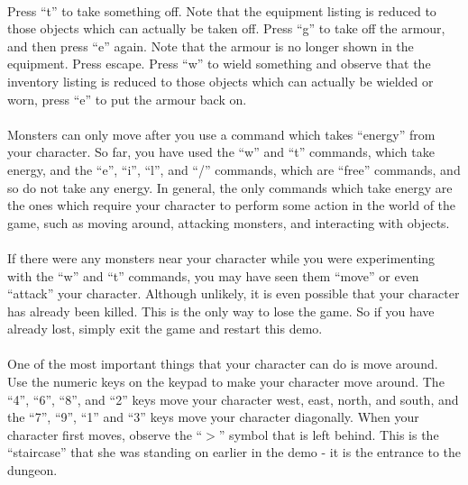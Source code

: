\paragraph{}Press ``t'' to take something off. Note that the equipment listing is
reduced to those objects which can actually be taken off. Press ``g'' to
take off the armour, and then press ``e'' again. Note that the armour is
no longer shown in the equipment. Press escape. Press ``w'' to wield
something and observe that the inventory listing is reduced to those
objects which can actually be wielded or worn, press ``e'' to put the
armour back on.

\paragraph{}Monsters can only move after you use a command which takes
``energy'' from
your character. So far, you have used the ``w'' and ``t'' commands, which
take energy, and the ``e'', ``i'', ``l'', and ``/'' commands, which are
``free''
commands, and so do not take any energy. In general, the only commands
which take energy are the ones which require your character to perform
some action in the world of the game, such as moving around, attacking
monsters, and interacting with objects.

\paragraph{}If there were any monsters near your character while you were
experimenting with the ``w'' and ``t'' commands, you may have seen them
``move'' or even ``attack'' your character. Although unlikely, it is even
possible that your character has already been killed. This is the only
way to lose the game. So if you have already lost, simply exit the game
and restart this demo.

\paragraph{}One of the most important things that your character can do is move
around. Use the numeric keys on the keypad to make your character move
around. The ``4'', ``6'', ``8'', and ``2'' keys move your character west, east,
north, and south, and the ``7'', ``9'', ``1'' and ``3'' keys move your character
diagonally. When your character first moves, observe the ``$>$'' symbol
that is left behind. This is the ``staircase'' that she was standing on
earlier in the demo - it is the entrance to the dungeon.

